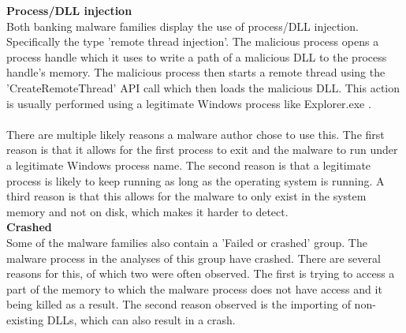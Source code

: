 \documentclass[conference]{IEEEtran}
\begin{document}
\textbf{Process/DLL injection}\\
Both banking malware families display the use of process/DLL injection. Specifically the type 'remote thread injection'. The malicious process opens a process handle which it uses to write a path of a malicious DLL to the process handle's memory. The malicious process then starts a remote thread using the 'CreateRemoteThread' API call which then loads the malicious DLL. This action is usually performed using a legitimate Windows process like Explorer.exe  \cite{alasiri-dll-injection}.\\\\There are multiple likely reasons a malware author chose to use this. The first reason is that it allows for the first process to exit and the malware to run under a legitimate Windows process name. The second reason is that a legitimate process is likely to keep running as long as the operating system is running. A third reason is that this allows for the malware to only exist in the system memory and not on disk, which makes it harder to detect.\\

\textbf{Crashed}\\
Some of the malware families also contain a 'Failed or crashed' group. The malware process in the analyses of this group have crashed. There are several reasons for this, of which two were often observed. The first is trying to access a part of the memory to which the malware process does not have access and it being killed as a result. The second reason observed is the importing of non-existing DLLs, which can also result in a crash.
\end{document}
